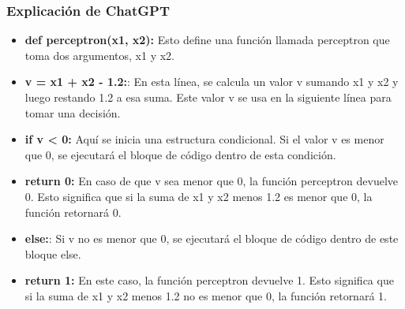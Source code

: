 \documentclass{beamer}
\begin{document}
\begin{frame}
\frametitle{Explicación de ChatGPT}
\begin{itemize}
\item \textbf{def perceptron(x1, x2):} Esto define una función llamada perceptron que toma dos argumentos, x1 y x2.

\item \textbf{v = x1 + x2 - 1.2:}: En esta línea, se calcula un valor v sumando x1 y x2 y luego restando 1.2 a esa suma. Este valor v se usa en la siguiente línea para tomar una decisión.

\item \textbf{if v < 0:} Aquí se inicia una estructura condicional. Si el valor v es menor que 0, se ejecutará el bloque de código dentro de esta condición.

\item \textbf{return 0:} En caso de que v sea menor que 0, la función perceptron devuelve 0. Esto significa que si la suma de x1 y x2 menos 1.2 es menor que 0, la función retornará 0.

\item \textbf{else:}: Si v no es menor que 0, se ejecutará el bloque de código dentro de este bloque else.

\item \textbf{return 1:} En este caso, la función perceptron devuelve 1. Esto significa que si la suma de x1 y x2 menos 1.2 no es menor que 0, la función retornará 1.

\end{itemize}
\end{frame}
\end{document}
